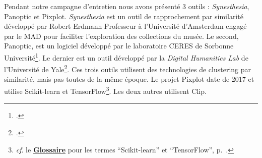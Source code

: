 Pendant notre campagne d'entretien nous avons présenté 3 outils : \textit{Synesthesia}, Panoptic et Pixplot. \textit{Synesthesia} est un outil de rapprochement par similarité développé par Robert Erdmann Professeur à l'Université d'Amsterdam engagé par le MAD pour faciliter l'exploration des collections du musée. Le second, Panoptic, est un logiciel développé par le laboratoire CERES de Sorbonne Université\footnote{\cite{noauthor_ceres_nodate}.}. Le dernier est un outil développé par la \textit{Digital Humanities Lab} de l'Université de Yale\footnote{\cite{noauthor_yale_nodate}.}. Ces trois outils utilisent des technologies de clustering par similarité, mais pas toutes de la même époque. Le projet Pixplot date de 2017 et utilise Scikit-learn et TensorFlow\footnote{\textit{cf}. le \textbf{\hyperref[sec:Glossaire]{Glossaire}} pour les termes \enquote{Scikit-learn} et \enquote{TensorFlow}, p.~\pageref{sec:Glossaire}.}. Les deux autres utilisent Clip. 

